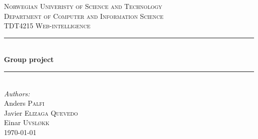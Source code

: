 \documentclass[11pt,a4paper]{report}
\newcommand{\HRule}{\rule{\linewidth}{0.5mm}}
\begin{document}
\begin{titlepage}
\center
\textsc{\Large Norwegian Univeristy of Science and Technology}\\[1.5cm]
\textsc{\large Department of Computer and Information Science}\\[0.5cm]
\textsc{TDT4215 Web-intelligence}\\[0.5cm]

\HRule \\[0.5cm]
{\huge \bfseries Group project}\\[0.2cm]
\HRule \\[1.5cm]

\Large \emph{Authors:}\\
Anders \textsc{Palfi}\\
Javier \textsc{Elizaga Quevedo}\\
Einar \textsc{Uvsløkk}\\[3cm]

{\large \today}\\[3cm]

\vfill

\end{titlepage}

\tableofcontents











\end{document}
